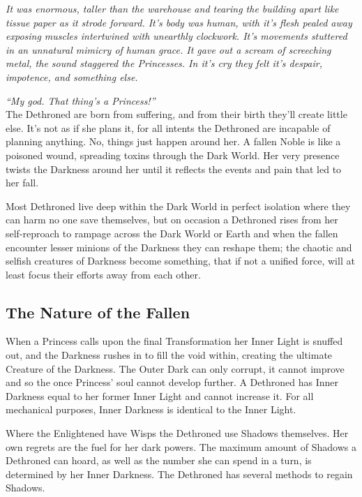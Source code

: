 \textit{It was enormous, taller than the warehouse and tearing the building apart like tissue paper as it strode forward. It's body was human, with it's flesh pealed away exposing muscles intertwined with unearthly clockwork. It's movements stuttered in an unnatural mimicry of human grace. It gave out a scream of screeching metal, the sound staggered the Princesses. In it's cry they felt it's despair, impotence, and something else.} 

\textit{\textquotedblleft My god. That thing's a Princess!\textquotedblright}\\

\noindent The Dethroned are born from suffering, and from their birth they'll create little else. It's not as if she plans it, for all intents the Dethroned are incapable of planning anything. No, things just happen around her. A fallen Noble is like a poisoned wound, spreading toxins through the Dark World. Her very presence twists the Darkness around her until it reflects the events and pain that led to her fall. 

Most Dethroned live deep within the Dark World in perfect isolation where they can harm no one save themselves, but on occasion a Dethroned rises from her self-reproach to rampage across the Dark World or Earth and when the fallen encounter lesser minions of the Darkness they can reshape them; the chaotic and selfish creatures of Darkness become something, that if not a unified force, will at least focus their efforts away from each other. 

\subsection*{The Nature of the Fallen}

When a Princess calls upon the final Transformation her Inner Light is snuffed out, and the Darkness rushes in to fill the void within, creating the ultimate Creature of the Darkness. The Outer Dark can only corrupt, it cannot improve and so the once Princess' soul cannot develop further. A Dethroned has Inner Darkness equal to her former Inner Light and cannot increase it. For all mechanical purposes, Inner Darkness is identical to the Inner Light.

Where the Enlightened have Wisps the Dethroned use Shadows themselves. Her own regrets are the fuel for her dark powers. The maximum amount of Shadows a Dethroned can hoard, as well as the number she can spend in a turn, is determined by her Inner Darkness. The Dethroned has several methods to regain Shadows.\\ 

